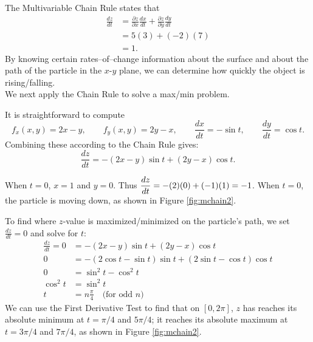 {The Multivariable Chain Rule states that 
\begin{align*}
\frac{dz}{dt} &= \frac{\partial z}{\partial x}\frac{dx}{dt} + \frac{\partial z}{\partial y}\frac{dy}{dt} \\
				&= 5(3)+(-2)(7) \\
				&=1.
\end{align*}
By knowing certain rates--of--change information about the surface and about the path of the particle in the $x$-$y$ plane, we can determine how quickly the object is rising/falling. 
}\\

We next apply the Chain Rule to solve a max/min problem.\\

{It is straightforward to compute
$$f_x(x,y) = 2x-y,\qquad f_y(x,y) = 2y-x,\qquad \frac{dx}{dt} = -\sin t,\qquad \frac{dy}{dt} = \cos t.$$
Combining these according to the Chain Rule gives:
$$\frac{dz}{dt} = -(2x-y)\sin t + (2y-x)\cos t.$$

When $t=0$, $x=1$ and $y=0$. Thus $\displaystyle\frac{dz}{dt} = -(2)(0)+ (-1)(1) = -1$. When $t=0$, the particle is moving down, as shown in Figure \ref{fig:mchain2}. 

To find where $z$-value is maximized/minimized on the particle's path, we set $\frac{dz}{dt}=0$ and solve for $t$:
\begin{align*}
\frac{dz}{dt} =0 &= -(2x-y)\sin t + (2y-x)\cos t\\
			0&= -(2\cos t-\sin t)\sin t+(2\sin t-\cos t)\cos t\\
			0&= \sin^2t-\cos^2t\\
\cos^2t &=\sin^2t\\
	t&= n\frac{\pi}4\quad \text{(for odd $n$)}
\end{align*}
We can use the First Derivative Test to find that on $[0,2\pi]$, $z$ has reaches its absolute minimum at $t=\pi/4$ and $5\pi/4$; it reaches its absolute maximum at $t=3\pi/4$ and $7\pi/4$, as shown in Figure \ref{fig:mchain2}.
}\\



